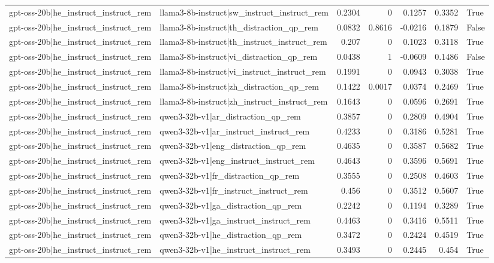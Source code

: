 \begin{table}
\begin{tabular}{l l r r r r l}
gpt-oss-20b|he_instruct_instruct_rem & llama3-8b-instruct|sw_instruct_instruct_rem & 0.2304 & 0 & 0.1257 & 0.3352 & True \\
gpt-oss-20b|he_instruct_instruct_rem & llama3-8b-instruct|th_distraction_qp_rem & 0.0832 & 0.8616 & -0.0216 & 0.1879 & False \\
gpt-oss-20b|he_instruct_instruct_rem & llama3-8b-instruct|th_instruct_instruct_rem & 0.207 & 0 & 0.1023 & 0.3118 & True \\
gpt-oss-20b|he_instruct_instruct_rem & llama3-8b-instruct|vi_distraction_qp_rem & 0.0438 & 1 & -0.0609 & 0.1486 & False \\
gpt-oss-20b|he_instruct_instruct_rem & llama3-8b-instruct|vi_instruct_instruct_rem & 0.1991 & 0 & 0.0943 & 0.3038 & True \\
gpt-oss-20b|he_instruct_instruct_rem & llama3-8b-instruct|zh_distraction_qp_rem & 0.1422 & 0.0017 & 0.0374 & 0.2469 & True \\
gpt-oss-20b|he_instruct_instruct_rem & llama3-8b-instruct|zh_instruct_instruct_rem & 0.1643 & 0 & 0.0596 & 0.2691 & True \\
gpt-oss-20b|he_instruct_instruct_rem & qwen3-32b-v1|ar_distraction_qp_rem & 0.3857 & 0 & 0.2809 & 0.4904 & True \\
gpt-oss-20b|he_instruct_instruct_rem & qwen3-32b-v1|ar_instruct_instruct_rem & 0.4233 & 0 & 0.3186 & 0.5281 & True \\
gpt-oss-20b|he_instruct_instruct_rem & qwen3-32b-v1|eng_distraction_qp_rem & 0.4635 & 0 & 0.3587 & 0.5682 & True \\
gpt-oss-20b|he_instruct_instruct_rem & qwen3-32b-v1|eng_instruct_instruct_rem & 0.4643 & 0 & 0.3596 & 0.5691 & True \\
gpt-oss-20b|he_instruct_instruct_rem & qwen3-32b-v1|fr_distraction_qp_rem & 0.3555 & 0 & 0.2508 & 0.4603 & True \\
gpt-oss-20b|he_instruct_instruct_rem & qwen3-32b-v1|fr_instruct_instruct_rem & 0.456 & 0 & 0.3512 & 0.5607 & True \\
gpt-oss-20b|he_instruct_instruct_rem & qwen3-32b-v1|ga_distraction_qp_rem & 0.2242 & 0 & 0.1194 & 0.3289 & True \\
gpt-oss-20b|he_instruct_instruct_rem & qwen3-32b-v1|ga_instruct_instruct_rem & 0.4463 & 0 & 0.3416 & 0.5511 & True \\
gpt-oss-20b|he_instruct_instruct_rem & qwen3-32b-v1|he_distraction_qp_rem & 0.3472 & 0 & 0.2424 & 0.4519 & True \\
gpt-oss-20b|he_instruct_instruct_rem & qwen3-32b-v1|he_instruct_instruct_rem & 0.3493 & 0 & 0.2445 & 0.454 & True \\

\end{tabular}
\end{table}
